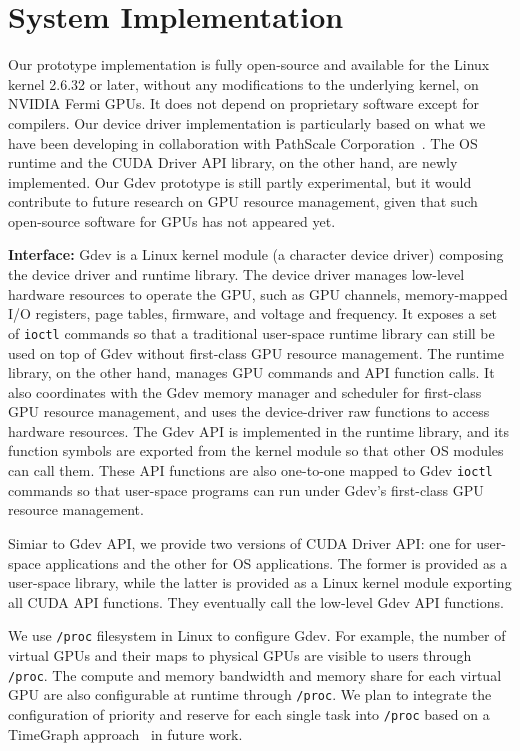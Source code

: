 \section{System Implementation}
\label{sec:implementation}

Our prototype implementation is fully open-source and available for the
Linux kernel 2.6.32 or later, without any modifications to the
underlying kernel, on NVIDIA Fermi GPUs.
It does not depend on proprietary software except for compilers.
Our device driver implementation is particularly based on what we have
been developing in collaboration with PathScale
Corporation~\cite{ENZO}.
The OS runtime and the CUDA Driver API library, on the other hand, are
newly implemented.
Our Gdev prototype is still partly experimental, but it would contribute
to future research on GPU resource management, given that such
open-source software for GPUs has not appeared yet.

\textbf{Interface:}
Gdev is a Linux kernel module (a character device driver) composing the
device driver and runtime library.
The device driver manages low-level hardware resources to operate the
GPU, such as GPU channels, memory-mapped I/O registers, page tables,
firmware, and voltage and frequency.
It exposes a set of \texttt{ioctl} commands so that a traditional
user-space runtime library can still be used on top of Gdev without 
first-class GPU resource management.
The runtime library, on the other hand, manages GPU commands and API
function calls.
It also coordinates with the Gdev memory manager and scheduler for
first-class GPU resource management, and uses
the device-driver raw functions to access hardware resources.
The Gdev API is implemented in the runtime library, and its function
symbols are exported from the kernel module so that other OS modules can
call them.
These API functions are also one-to-one mapped to Gdev \texttt{ioctl}
commands so that user-space programs can run under Gdev's first-class
GPU resource management.

Simiar to Gdev API, we provide two versions of CUDA Driver API: one for
user-space applications and the other for OS applications.
The former is provided as a user-space library, while the latter is
provided as a Linux kernel module exporting all CUDA API functions.
They eventually call the low-level Gdev API functions.

We use \texttt{/proc} filesystem in Linux to configure Gdev.
For example, the number of virtual GPUs and their maps to physical GPUs
are visible to users through \texttt{/proc}.
The compute and memory bandwidth and memory share for each virtual GPU
are also configurable at runtime through \texttt{/proc}.
We plan to integrate the configuration of priority and reserve for
each single task into \texttt{/proc} based on a TimeGraph
approach~\cite{Kato_ATC11} in future work.

